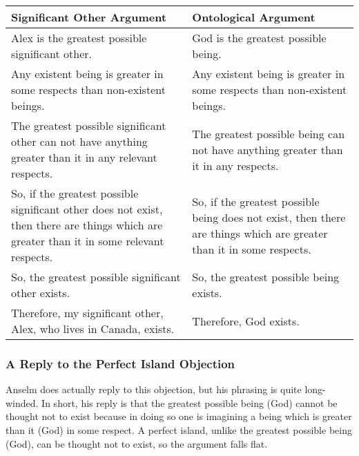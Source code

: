 \noindent
\begin{tabular}{p{2.75in}|p{2.75in}}
Significant Other Argument&Ontological Argument\\\hline
    Alex is the greatest possible significant other.&God is the greatest possible being.\\
    Any existent being is greater in some respects than non-existent beings.&Any existent being is greater in some respects than non-existent beings.\\
    The greatest possible significant other can not have anything greater than it in any relevant respects.&The greatest possible being can not have anything greater than it in any respects.\\
    So, if the greatest possible significant other does not exist, then there are things which are greater than it in some relevant respects.&So, if the greatest possible being does not exist, then there are things which are greater than it in some respects.\\
    So, the greatest possible significant other exists.&So, the greatest possible being exists.\\
    Therefore, my significant other, Alex, who lives in Canada, exists.&Therefore, God exists.\\
\end{tabular}
 
\subsubsection{A Reply to the Perfect Island Objection}

Anselm does actually reply to this objection, but his phrasing is quite long-winded. In short, his reply is that the greatest possible being (God) cannot be thought not to exist because in doing so one is imagining a being which is greater than it (God) in some respect. A perfect island, unlike the greatest possible being (God), can be thought not to exist, so the argument falls flat.\autocite[p. 175-77]{Anselm2}  
 
